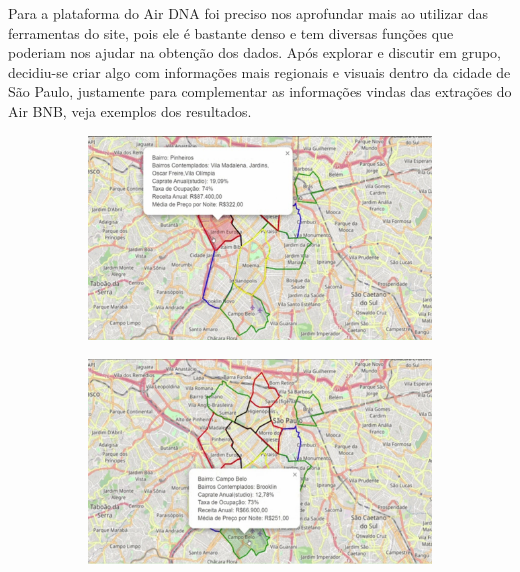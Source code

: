 Para a plataforma do Air DNA foi preciso nos aprofundar mais ao 
utilizar das ferramentas do site, pois ele é bastante denso e tem diversas 
funções que poderiam nos ajudar na obtenção dos dados. Após explorar e 
discutir em grupo, decidiu-se criar algo com informações mais regionais e 
visuais dentro da cidade de São Paulo, justamente para complementar as 
informações vindas das extrações do Air BNB, veja exemplos dos resultados.

\begin{figure}
    \begin{subfigure}{0.49\linewidth}
        \includegraphics[width = \textwidth]{relatorios/lounge/imagens/1.jpg}
    \end{subfigure}
    \hfill
    \begin{subfigure}{0.49\linewidth}
        \includegraphics[width = \textwidth]{relatorios/lounge/imagens/2.jpg}
    \end{subfigure}
    \begin{subfigure}{0.49\linewidth}

\end{subfigure}
\end{figure}
